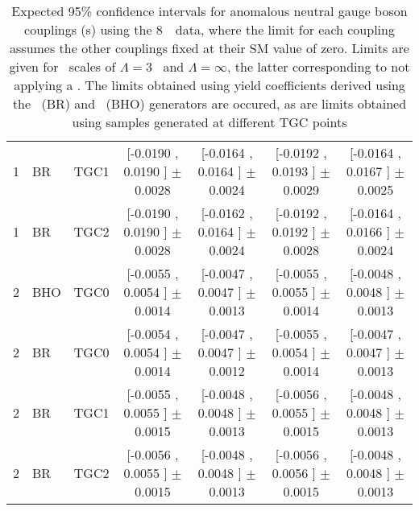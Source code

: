 \begin{landscape}
\begin{table}[htbp]
\begin{tabular}{lllcccc}
  1 &   BR &  TGC1 &  [-0.0190 , 0.0190 ] $\pm$ 0.0028 &  [-0.0164 , 0.0164 ] $\pm$ 0.0024 &  [-0.0192 , 0.0193 ] $\pm$ 0.0029 &  [-0.0164 , 0.0167 ] $\pm$ 0.0025 \\
  1 &   BR &  TGC2 &  [-0.0190 , 0.0190 ] $\pm$ 0.0028 &  [-0.0162 , 0.0164 ] $\pm$ 0.0024 &  [-0.0192 , 0.0192 ] $\pm$ 0.0028 &  [-0.0164 , 0.0166 ] $\pm$ 0.0024 \\
  2 &  BHO &  TGC0 &  [-0.0055 , 0.0054 ] $\pm$ 0.0014 &  [-0.0047 , 0.0047 ] $\pm$ 0.0013 &  [-0.0055 , 0.0055 ] $\pm$ 0.0014 &  [-0.0048 , 0.0048 ] $\pm$ 0.0013 \\
  2 &   BR &  TGC0 &  [-0.0054 , 0.0054 ] $\pm$ 0.0014 &  [-0.0047 , 0.0047 ] $\pm$ 0.0012 &  [-0.0055 , 0.0054 ] $\pm$ 0.0014 &  [-0.0047 , 0.0047 ] $\pm$ 0.0013 \\
  2 &   BR &  TGC1 &  [-0.0055 , 0.0055 ] $\pm$ 0.0015 &  [-0.0048 , 0.0048 ] $\pm$ 0.0013 &  [-0.0056 , 0.0055 ] $\pm$ 0.0015 &  [-0.0048 , 0.0048 ] $\pm$ 0.0013 \\
  2 &   BR &  TGC2 &  [-0.0056 , 0.0055 ] $\pm$ 0.0015 &  [-0.0048 , 0.0048 ] $\pm$ 0.0013 &  [-0.0056 , 0.0056 ] $\pm$ 0.0015 &  [-0.0048 , 0.0048 ] $\pm$ 0.0013 \\
\hline\hline
\end{tabular}
           \caption{
           Expected 95\% confidence intervals for anomalous neutral
           gauge boson couplings (\TGC s) using the 8~\tev\ data, where 
           the limit for each coupling assumes the other couplings
           fixed at their SM value of zero. 
           Limits are given for \formfactor\ scales of $\Lambda = 3$ \TeV\
           and $\Lambda = \infty$, the latter corresponding to not applying a \formfactor. 
           The limits obtained using yield coefficients derived using the \BR\ (BR) and
           \BHO\ (BHO) generators are occured, as are limits obtained using
           samples generated at different TGC points
           }
           \label{table:TGC-obs-exp-limits-seven}
\end{table}
 \end{landscape}

